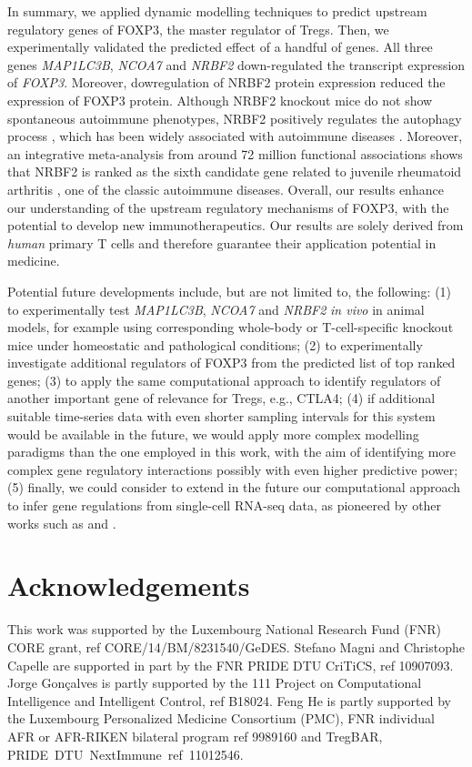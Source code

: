 \documentclass[oneside, 10pt, a4paper, twocolumn]{article}
\begin{document}
In summary, we applied dynamic modelling techniques to predict upstream regulatory genes of FOXP3, the master regulator of Tregs. Then, we experimentally validated the predicted effect of a handful of genes. All three genes \textit{MAP1LC3B}, \textit{NCOA7} and \textit{NRBF2} down-regulated the transcript expression of \textit{FOXP3}. Moreover, dowregulation of NRBF2 protein expression reduced the expression of FOXP3 protein. 
Although NRBF2 knockout mice do not show spontaneous autoimmune phenotypes, NRBF2 positively regulates the autophagy process \citep{Lu2014}, which has been widely associated with  autoimmune diseases \citep{GIANCHECCHI2014}. Moreover, an integrative meta-analysis from around 72 million functional associations shows that NRBF2 is ranked as the sixth candidate gene related to juvenile rheumatoid arthritis \citep{Rouillard2016}, one of the classic autoimmune diseases. Overall, our results enhance our understanding of the upstream regulatory mechanisms of FOXP3, with the potential to develop new immunotherapeutics. Our results are solely derived from {\em human} primary T cells and therefore guarantee their application potential in medicine.

Potential future developments 
include, but are not limited to, the following: (1) to experimentally test  \textit{MAP1LC3B}, \textit{NCOA7} and \textit{NRBF2} \textit{in vivo} in animal models, for example using corresponding whole-body or T-cell-specific knockout mice under homeostatic and pathological conditions; (2) to experimentally investigate additional regulators of FOXP3 from the predicted list of top ranked genes; (3) to apply the same computational approach to identify regulators of another important gene of relevance for Tregs, e.g., CTLA4; (4) if additional suitable time-series data with even shorter sampling intervals for this system would be available in the future, we would apply more complex modelling paradigms than the one employed in this work, with the aim of identifying more complex gene regulatory interactions possibly with even higher predictive power; (5) finally, we could consider to extend in the future our computational approach to infer gene regulations from single-cell RNA-seq data, as pioneered by other works such as \citep{Chan2017} and \citep{Ocone2015}.




\section*{Acknowledgements}    
\label{Section:Acknowledgements}
This work was supported by the Luxembourg National Research Fund (FNR) CORE grant, ref  CORE/14/BM/8231540/GeDES. 
Stefano Magni and Christophe Capelle are supported in part by the FNR PRIDE DTU CriTiCS, ref 10907093. 
Jorge Gon\c{c}alves is partly supported by the 111 Project on Computational Intelligence and Intelligent Control, ref B18024. 
Feng He is partly supported by the Luxembourg Personalized Medicine Consortium (PMC), FNR individual AFR or AFR-RIKEN bilateral program ref 9989160 and TregBAR, \mbox{PRIDE DTU NextImmune ref 11012546.}
\end{document}
